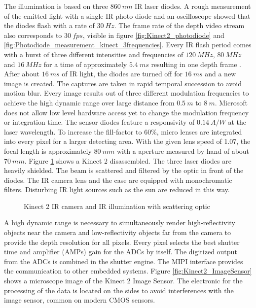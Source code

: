 The illumination is based on three $860~nm$ IR laser diodes. A rough measurement of the emitted light with a single IR photo diode and an oscilloscope showed that the diodes flash with a rate of $30~Hz$. The frame rate of the depth video stream also corresponds to $30~fps$, visible in figure \ref{fig:Kinect2_photodiode} and \ref{fig:Photodiode_measurement_kinect_3frequencies}. Every IR flash period comes with a burst of three different intensities and frequencies of $120~MHz$, $80~MHz$ and $16~MHz$ for a time of approximately $5.4~ms$ resulting in one depth frame \cite{sell2014xbox}. After about $16~ms$ of IR light, the diodes are turned off for $16~ms$ and a new image is created. The captures are taken in rapid temporal succession to avoid motion blur. Every image results out of three different modulation frequencies to achieve the high dynamic range over large distance from $0.5~m$ to $8~m$. Microsoft does not allow low level hardware access yet to change the modulation frequency or integration time.
The sensor diodes feature a responsivity of $0.14~ A/W$ at the laser wavelength. To increase the fill-factor to $60\%$, micro lenses are integrated into every pixel for a larger detecting area. With the given lens speed of 1.07, the focal length is approximately $80~mm$ with a aperture measured by hand of about $70~mm$. Figure \ref{fig:Kinect2_optic} shows a Kinect 2 disassembled. The three laser diodes are heavily shielded. The beam is scattered and filtered by the optic in front of the diodes. The IR camera lens and the case are equipped with monochromatic filters. Disturbing IR light sources such as the sun are reduced in this way.\\ 
 
 \begin{figure}[!h]
 	\centering
 	\caption{Kinect 2 IR camera and IR illumination with scattering optic }
 	\label{fig:Kinect2_optic}
 \end{figure} 
 

A high dynamic range is necessary to simultaneously render high-reflectivity objects near the camera and low-reflectivity objects far from the camera to provide the depth resolution for all pixels. Every pixel selects the best shutter time and amplifier (AMPs) gain for the ADCs by itself. The digitized output from the ADCs is combined in the shutter engine. The MIPI interface provides the communication to other embedded systems. Figure \ref{fig:Kinect2_ImageSensor} shows a microscope image of the Kinect 2 Image Sensor. The electronic for the processing of the data is located on the sides to avoid interferences with the image sensor, common on modern CMOS sensors.\\

